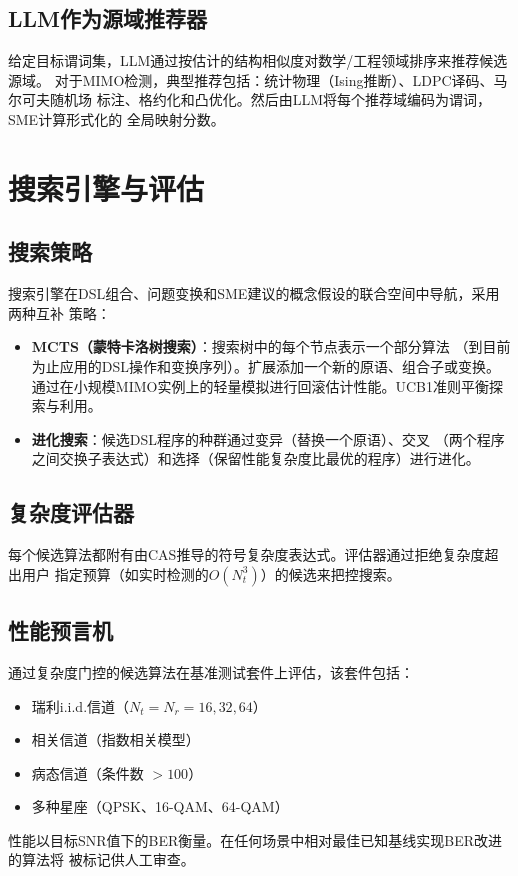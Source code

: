 \documentclass[12pt,a4paper]{article}
\begin{document}
\subsection{LLM作为源域推荐器}

给定目标谓词集，LLM通过按估计的结构相似度对数学/工程领域排序来推荐候选源域。
对于MIMO检测，典型推荐包括：统计物理（Ising推断）、LDPC译码、马尔可夫随机场
标注、格约化和凸优化。然后由LLM将每个推荐域编码为谓词，SME计算形式化的
全局映射分数。

\section{搜索引擎与评估}
\label{sec:search}

\subsection{搜索策略}

搜索引擎在DSL组合、问题变换和SME建议的概念假设的联合空间中导航，采用两种互补
策略：

\begin{itemize}[itemsep=2pt]
  \item \textbf{MCTS（蒙特卡洛树搜索）}：搜索树中的每个节点表示一个部分算法
        （到目前为止应用的DSL操作和变换序列）。扩展添加一个新的原语、组合子或变换。
        通过在小规模MIMO实例上的轻量模拟进行回滚估计性能。UCB1准则平衡探索与利用。
  \item \textbf{进化搜索}：候选DSL程序的种群通过变异（替换一个原语）、交叉
        （两个程序之间交换子表达式）和选择（保留性能复杂度比最优的程序）进行进化。
\end{itemize}

\subsection{复杂度评估器}

每个候选算法都附有由CAS推导的符号复杂度表达式。评估器通过拒绝复杂度超出用户
指定预算（如实时检测的$O(N_t^3)$）的候选来把控搜索。

\subsection{性能预言机}

通过复杂度门控的候选算法在基准测试套件上评估，该套件包括：
\begin{itemize}[itemsep=0pt]
  \item 瑞利i.i.d.信道（$N_t = N_r = 16, 32, 64$）
  \item 相关信道（指数相关模型）
  \item 病态信道（条件数 $> 100$）
  \item 多种星座（QPSK、16-QAM、64-QAM）
\end{itemize}
性能以目标SNR值下的BER衡量。在任何场景中相对最佳已知基线实现BER改进的算法将
被标记供人工审查。
\end{document}
